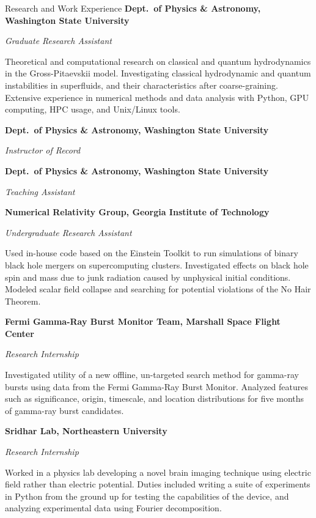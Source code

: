 \begingroup  %

\newcommand{\job}[4]{%
    \entry*[#1]\textbf{#2}

        \textit{#3}

        #4%
}


\begin{rubric}{Research and Work Experience}
    \job{2023--present}
        {Dept.\ of Physics \& Astronomy, Washington State University}
        {Graduate Research Assistant}
        {Theoretical and computational research on classical and quantum
        hydrodynamics in the Gross-Pitaevskii model.  Investigating classical
        hydrodynamic and quantum instabilities in superfluids, and their
        characteristics after coarse-graining.  Extensive experience in numerical
        methods and data analysis with Python, GPU computing, HPC usage, and
        Unix/Linux tools.}

    \job{2023--2024}
        {Dept.\ of Physics \& Astronomy, Washington State University}
        {Instructor of Record}
        {}

    \job{2019--2022}
        {Dept.\ of Physics \& Astronomy, Washington State University}
        {Teaching Assistant}
        {}

    \job{2016--2019}
        {Numerical Relativity Group, Georgia Institute of Technology}
        {Undergraduate Research Assistant}
        {Used in-house code based on the Einstein Toolkit to run simulations of
        binary black hole mergers on supercomputing clusters.  Investigated effects
        on black hole spin and mass due to junk radiation caused by unphysical
        initial conditions.  Modeled scalar field collapse and searching for
        potential violations of the No Hair Theorem.}

    \job{Summer 2017}
        {Fermi Gamma-Ray Burst Monitor Team, \smc{NASA} Marshall Space Flight Center}
        {Research Internship}
        {Investigated utility of a new offline, un-targeted search method for
        gamma-ray bursts using data from the Fermi Gamma-Ray Burst Monitor.
        Analyzed features such as significance, origin, timescale, and location
        distributions for five months of gamma-ray burst candidates.}

    \job{Summer 2016}
        {Sridhar Lab, Northeastern University}
        {Research Internship}
        {Worked in a physics lab developing a novel brain imaging technique using
        electric field rather than electric potential.  Duties included writing a
        suite of experiments in Python from the ground up for testing the
        capabilities of the device, and analyzing experimental data using Fourier
        decomposition.}

\end{rubric}

\endgroup

